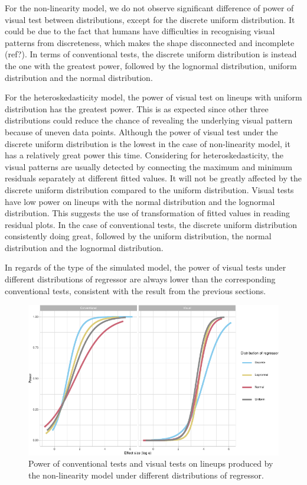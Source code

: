 \documentclass[]{interact}
\theoremstyle{plain}%
\theoremstyle{definition}
\theoremstyle{remark}
\begin{document}
For the non-linearity model, we do not observe significant difference of
power of visual test between distributions, except for the discrete
uniform distribution. It could be due to the fact that humans have
difficulties in recognising visual patterns from discreteness, which
makes the shape disconnected and incomplete (ref?). In terms of
conventional tests, the discrete uniform distribution is instead the one
with the greatest power, followed by the lognormal distribution, uniform
distribution and the normal distribution.

For the heteroskedasticity model, the power of visual test on lineups
with uniform distribution has the greatest power. This is as expected
since other three distributions could reduce the chance of revealing the
underlying visual pattern because of uneven data points. Although the
power of visual test under the discrete uniform distribution is the
lowest in the case of non-linearity model, it has a relatively great
power this time. Considering for heteroskedasticity, the visual patterns
are usually detected by connecting the maximum and minimum residuals
separately at different fitted values. It will not be greatly affected
by the discrete uniform distribution compared to the uniform
distribution. Visual tests have low power on lineups with the normal
distribution and the lognormal distribution. This suggests the use of
transformation of fitted values in reading residual plots. In the case
of conventional tests, the discrete uniform distribution consistently
doing great, followed by the uniform distribution, the normal
distribution and the lognormal distribution.

In regards of the type of the simulated model, the power of visual tests
under different distributions of regressor are always lower than the
corresponding conventional tests, consistent with the result from the
previous sections.

\begin{figure}

{\centering \includegraphics[width=1\linewidth]{paper_comparison_files/figure-latex/different-x-dist-poly-power-1} 

}

\caption{Power of conventional tests and visual tests on lineups produced by the non-linearity model under different distributions of regressor.}\label{fig:different-x-dist-poly-power}
\end{figure}
\end{document}
